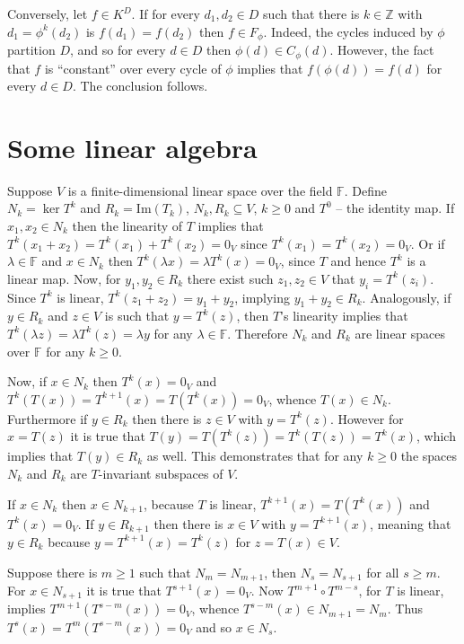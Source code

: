 \documentclass[a4paper]{article}
\newcommand{\brac}[1]{{\left({#1}\right)}}
\newcommand{\im}[1]{\ensuremath{\text{Im}\brac{ #1 }}}
\begin{document}
Conversely, let $f\in K^D$. If for every $d_1, d_2\in D$ such that there is $k\in \mathbb{Z}$ with $d_1=\phi^k(d_2)$ is $f(d_1)=f(d_2)$ then $f\in F_\phi$. Indeed, the cycles induced by $\phi$ partition $D$, and so for every $d\in D$  then $\phi(d)\in C_\phi(d)$. However, the fact that $f$ is ``constant'' over every cycle of $\phi$ implies that $f(\phi(d)) = f(d)$ for every $d\in D$. The conclusion follows.






\section{Some linear algebra} %
\label{sec:some_linear_algebra}
Suppose $V$ is a finite-dimensional linear space over the field $\mathbb{F}$. Define $N_k = \ker{T^k}$ and $R_k = \im{T_k}$, $N_k, R_k \subseteq V$, $k\geq 0$ and $T^0$ -- the identity map. If $x_1, x_2\in N_k$ then the linearity of $T$ implies that $T^k(x_1+x_2) = T^k(x_1)+T^k(x_2) = 0_V$ since $T^k(x_1) = T^k(x_2) = 0_V$. Or if $\lambda\in \mathbb{F}$ and $x\in N_k$ then $T^k\brac{\lambda x} = \lambda T^k(x) = 0_V$, since $T$ and hence $T^k$ is a linear map. Now, for $y_1, y_2\in R_k$ there exist such $z_1, z_2\in V$ that $y_i=T^k(z_i)$. Since $T^k$ is linear, $T^k\brac{z_1+z_2} = y_1+y_2$, implying $y_1+y_2\in R_k$. Analogously, if $y\in R_k$ and $z\in V$ is such that $y=T^k(z)$, then $T$'s linearity implies that $T^k(\lambda z) = \lambda T^k(z) = \lambda y$ for any $\lambda \in \mathbb{F}$. Therefore $N_k$ and $R_k$ are linear spaces over $\mathbb{F}$ for any $k\geq 0$.

Now, if $x\in N_k$ then $T^k(x) = 0_V$ and $T^k\brac{T(x)} = T^{k+1}(x) = T\brac{T^k(x)}=0_V$, whence $T(x)\in N_k$. Furthermore if $y\in R_k$ then there is $z\in V$ with $y=T^k(z)$. However for $x=T(z)$ it is true that $T(y)=T\brac{T^k(z)} = T^k\brac{T(z)} = T^k(x)$, which implies that $T(y)\in R_k$ as well. This demonstrates that for any $k\geq 0$ the spaces $N_k$ and $R_k$ are $T$-invariant subspaces of $V$.

If $x\in N_k$ then $x\in N_{k+1}$, because $T$ is linear, $T^{k+1}(x) = T\brac{T^k(x)}$ and $T^k(x) = 0_V$. If $y\in R_{k+1}$ then there is $x\in V$ with $y=T^{k+1}(x)$, meaning that $y\in R_k$ because $y = T^{k+1}(x) = T^k(z)$ for $z=T(x) \in V$.

Suppose there is $m\geq 1$ such that $N_m=N_{m+1}$, then $N_s=N_{s+1}$ for all $s\geq m$. For $x\in N_{s+1}$ it is true that $T^{s+1}(x)=0_V$. Now $T^{m+1}\circ T^{m-s}$, for $T$ is linear, implies $T^{m+1}\brac{T^{s-m}(x)} = 0_V$, whence $T^{s-m}(x)\in N_{m+1} = N_m$. Thus $T^s(x) = T^m\brac{T^{s-m}(x)} = 0_V$ and so $x\in N_s$.
\end{document}

